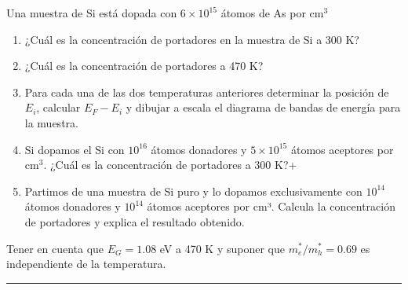 	Una muestra de Si está dopada con \( 6 \times 10^{15} \) átomos de As por cm$^3$
	\begin{enumerate}[label=\alph*)]
		\item ¿Cuál es la concentración de portadores en la muestra de Si a 300 K?
		\item ¿Cuál es la concentración de portadores a 470 K?
		\item Para cada una de las dos temperaturas anteriores determinar la posición de \( E_i \), calcular \( E_F - E_i \) y dibujar a escala el diagrama de bandas de energía para la muestra.
		\item Si dopamos el Si con \( 10^{16} \) átomos donadores y \( 5 \times 10^{15} \) átomos aceptores por cm$^3$. ¿Cuál es la concentración de portadores a 300 K?+
		\item Partimos de una muestra de Si puro y lo dopamos exclusivamente con \( 10^{14} \) átomos donadores y \( 10^{14} \) átomos aceptores por cm³. Calcula la concentración de portadores y explica el resultado obtenido.
	\end{enumerate}
	Tener en cuenta que \( E_G = 1.08 \) eV a 470 K y suponer que \( m_e^*/m_h^* = 0.69 \) es independiente de la temperatura.


\rule{\textwidth}{0.1pt} \\[2pt]

